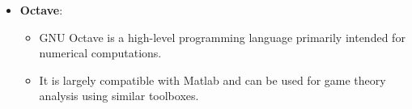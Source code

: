 \documentclass[12pt]{book} %
\begin{document}
\begin{itemize}
\begin{itemize}
\begin{lstlisting}[language=Python, caption=Computing Nash Equilibria with Nashpy]
# Create a bi-matrix game
game = nash.Game(A, B)

# Compute Nash equilibria
equilibria = game.support_enumeration()
for eq in equilibria:
    print(eq)
\end{lstlisting}
\FloatBarrier
        \end{itemize}
    \item \textbf{Octave}:
        \begin{itemize}
            \item GNU Octave is a high-level programming language primarily intended for numerical computations.
            \item It is largely compatible with Matlab and can be used for game theory analysis using similar toolboxes.
        \end{itemize}
\end{itemize}
\end{document}
